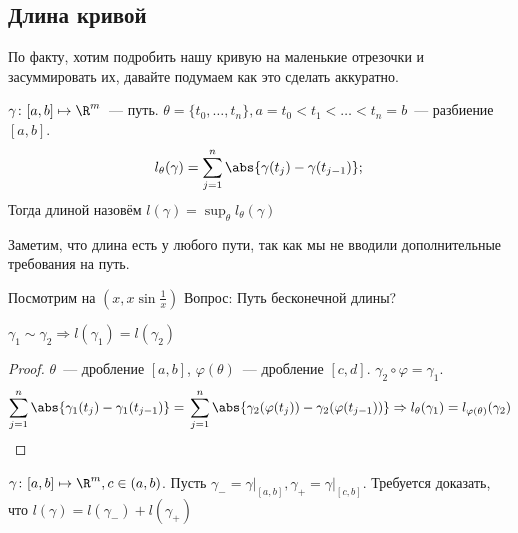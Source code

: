 \subsection{Длина кривой}
По факту, хотим подробить нашу кривую на маленькие отрезочки
и засуммировать их, давайте подумаем как это сделать аккуратно.\\
\quad
\begin{definition}
    $\gamma\colon [a, b]\mapsto \R^m$~--- путь.
    $\theta = \{t_0,\dots, t_n\}, a = t_0 < t_1 < \dots < t_n = b$~---
    разбиение $[a, b]$.
    \[
        l_\theta(\gamma) = \sum\limits_{j = 1}^{n} \abs{\gamma(t_j) - \gamma(t_{j - 1})};\\
    \]
    Тогда длиной назовём  $l(\gamma) = \sup_\theta l_\theta(\gamma)$
\end{definition}
\begin{remark}
    Заметим, что длина есть у любого пути, так как мы не вводили
    дополнительные требования на путь.
\end{remark}
\begin{remark}
    Посмотрим на $(x, x\sin \frac{1}{x})$
    Вопрос: Путь бесконечной длины?
\end{remark}
\begin{theorem}
    $\gamma_1 \sim \gamma_2\Rightarrow l(\gamma_1) = l(\gamma_2)$
\end{theorem}
\begin{proof}
    $\theta$~--- дробление $[a,b]$,
    $\varphi(\theta)$~--- дробление $[c,d]$.
    $\gamma_2\circ\varphi=\gamma_1$.
    \[
        \sum\limits_{j = 1}^{n}\abs{\gamma_1(t_j) - \gamma_1(t_{j-1})}=\\
        \sum\limits_{j=1}^{n}\abs{\gamma_2(\varphi(t_j))-\gamma_2(\varphi(t_{j-1}))}
        \Rightarrow
        l_{\theta}(\gamma_1) = l_{\varphi(\theta)}(\gamma_2)
    \]
\end{proof}
\begin{theorem}
    $\gamma\colon [a,b]\mapsto\R^m, c\in(a,b)$.
    Пусть $\gamma_{-}=\gamma\big|_{[a,b]}, \gamma_{+} = \gamma\big|_{[c,b]}$.
    Требуется доказать, что $l(\gamma)=l(\gamma_-) + l(\gamma_+)$
\end{theorem}
